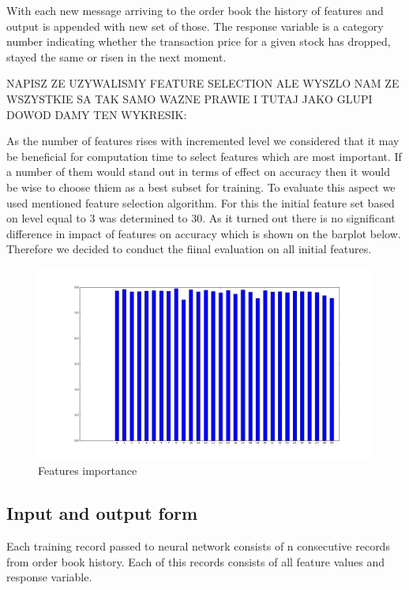 \documentclass[twoside]{article}
\begin{document}
\begin{multicols}{2}
With each new message arriving to the order book the history of features and output is appended with new set of those.
The response variable is a category number indicating whether the transaction price for a given stock has dropped, stayed the same or risen in the next moment.

NAPISZ ZE UZYWALISMY FEATURE SELECTION ALE WYSZLO NAM ZE WSZYSTKIE SA TAK SAMO WAZNE PRAWIE I TUTAJ JAKO
GLUPI DOWOD DAMY TEN WYKRESIK:

As the number of features rises with incremented level we considered that it may be beneficial for computation time to select features which are most important. If a number of them would stand out in terms of effect on accuracy then it would be wise to choose thiem as a best subset for training.
To evaluate this aspect we used mentioned feature selection algorithm. For this the initial feature set based on level equal to 3 was determined to 30. As it turned out there is no significant difference in impact of features on accuracy which is shown on the barplot below. Therefore we decided to conduct the fiinal evaluation on all initial features.

\begin{figure}[H]
\centering
\includegraphics[scale=0.15]{../results/features}
\caption{Features importance}
\label{ref:rnn}
\end{figure} 

\subsection{Input and output form}
Each training record passed to neural network consists of n consecutive records from order book history. Each of this records consists of all feature values and response variable.


\end{multicols}
\end{document}
